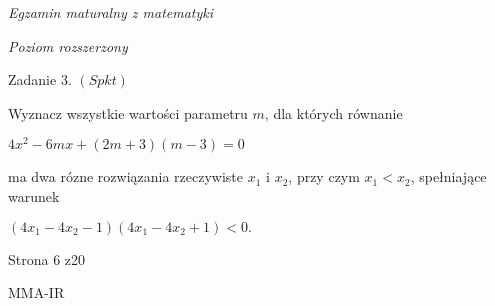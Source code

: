\documentclass[a4paper,12pt]{article}
\begin{document}
{\it Egzamin maturalny z matematyki}

{\it Poziom rozszerzony}

Zadanie 3. $(Spkt)$

Wyznacz wszystkie wartości parametru $m$, dla których równanie

$4x^{2}-6mx+(2m+3)(m-3)=0$

ma dwa rózne rozwiązania rzeczywiste $x_{1}$ i $x_{2}$, przy czym $x_{1}<x_{2}$, spełniające warunek

$(4x_{1}-4x_{2}-1)(4x_{1}-4x_{2}+1)<0.$

Strona 6 z20

MMA-IR
\end{document}
